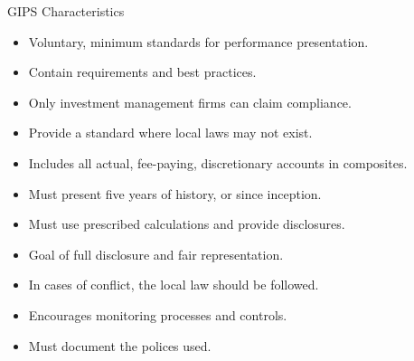 \documentclass[../custom]{flashcards}
\begin{document}
\begin{flashcard}[\studyArea]{GIPS Characteristics}
    \begin{itemize}
        \item Voluntary, minimum standards for performance presentation.
        \item Contain requirements and best practices.
        \item Only investment management firms can claim compliance.
        \item Provide a standard where local laws may not exist.
        \item Includes all actual, fee-paying, discretionary accounts in composites.
        \item Must present five years of history, or since inception.
        \item Must use prescribed calculations and provide disclosures.
        \item Goal of full disclosure and fair representation.
        \item In cases of conflict, the local law should be followed.
        \item Encourages monitoring processes and controls.
        \item Must document the polices used.
    \end{itemize}
\end{flashcard}
\end{document}
